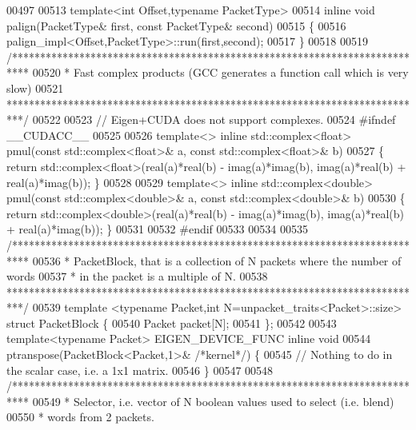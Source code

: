 \begin{DoxyCode}
{{00497 
00513 \textcolor{keyword}{template}<\textcolor{keywordtype}{int} Offset,\textcolor{keyword}{typename} PacketType>
00514 \textcolor{keyword}{inline} \textcolor{keywordtype}{void} palign(PacketType& first, \textcolor{keyword}{const} PacketType& second)
00515 \{
00516   palign\_impl<Offset,PacketType>::run(first,second);
00517 \}
00518 
00519 \textcolor{comment}{/***************************************************************************}
00520 \textcolor{comment}{* Fast complex products (GCC generates a function call which is very slow)}
00521 \textcolor{comment}{***************************************************************************/}
00522 
00523 \textcolor{comment}{// Eigen+CUDA does not support complexes.}
00524 \textcolor{preprocessor}{#ifndef \_\_CUDACC\_\_}
00525 
00526 \textcolor{keyword}{template}<> \textcolor{keyword}{inline} std::complex<float> pmul(\textcolor{keyword}{const} std::complex<float>& a, \textcolor{keyword}{const} std::complex<float>& b)
00527 \{ \textcolor{keywordflow}{return} std::complex<float>(real(a)*real(b) - imag(a)*imag(b), imag(a)*real(b) + real(a)*imag(b)); \}
00528 
00529 \textcolor{keyword}{template}<> \textcolor{keyword}{inline} std::complex<double> pmul(\textcolor{keyword}{const} std::complex<double>& a, \textcolor{keyword}{const} std::complex<double>& b)
00530 \{ \textcolor{keywordflow}{return} std::complex<double>(real(a)*real(b) - imag(a)*imag(b), imag(a)*real(b) + real(a)*imag(b)); \}
00531 
00532 \textcolor{preprocessor}{#endif}
00533 
00534 
00535 \textcolor{comment}{/***************************************************************************}
00536 \textcolor{comment}{ * PacketBlock, that is a collection of N packets where the number of words}
00537 \textcolor{comment}{ * in the packet is a multiple of N.}
00538 \textcolor{comment}{***************************************************************************/}
00539 template <typename Packet,int N=unpacket\_traits<Packet>::size> \textcolor{keyword}{struct }PacketBlock \{
00540   Packet packet[N];
00541 \};
00542 
00543 \textcolor{keyword}{template}<\textcolor{keyword}{typename} Packet> EIGEN\_DEVICE\_FUNC \textcolor{keyword}{inline} \textcolor{keywordtype}{void}
00544 ptranspose(PacketBlock<Packet,1>& \textcolor{comment}{/*kernel*/}) \{
00545   \textcolor{comment}{// Nothing to do in the scalar case, i.e. a 1x1 matrix.}
00546 \}
00547 
00548 \textcolor{comment}{/***************************************************************************}
00549 \textcolor{comment}{ * Selector, i.e. vector of N boolean values used to select (i.e. blend)}
00550 \textcolor{comment}{ * words from 2 packets.}
}}
\end{DoxyCode}
